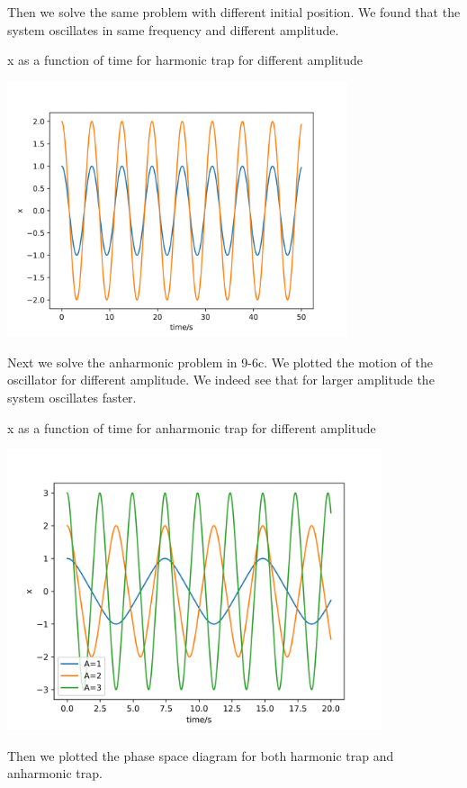 \documentclass[letterpaper,12pt]{article}
\begin{document}
Then we solve the same problem with different initial position. We found that the system oscillates in same frequency and different amplitude.

\begin{table}[!h]
    \centering
    \caption{x as a function of time for harmonic trap for different amplitude}
    \includegraphics[width=10cm]{9-6b.png}
\end{table}%

Next we solve the anharmonic problem in 9-6c. We plotted the motion of the oscillator for different amplitude. We indeed see that for larger amplitude the system oscillates faster.

\begin{table}[!h]
    \centering
    \caption{x as a function of time for anharmonic trap for different amplitude}
    \includegraphics[width=11cm]{9-6c.png}
\end{table}%

Then we plotted the phase space diagram for both harmonic trap and anharmonic trap.
\end{document}
